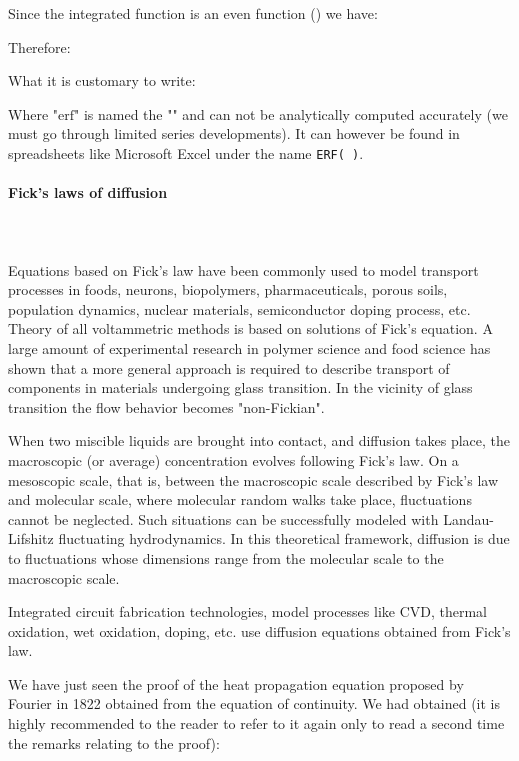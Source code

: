 	\begin{tcolorbox}[colframe=black,colback=white,sharp corners]
	
	Since the integrated function is an even function () we have:
	
	Therefore:
	
	What it is customary to write:
	
	Where "$\mathrm{erf}$" is named the "" and can not be analytically computed accurately (we must go through limited series developments). It can however be found in spreadsheets like Microsoft Excel under the name \texttt{ERF( )}.	
	\end{tcolorbox}
	
	\pagebreak
	\paragraph{Fick's laws of diffusion}\mbox{}\\\\
	Equations based on Fick's law have been commonly used to model transport processes in foods, neurons, biopolymers, pharmaceuticals, porous soils, population dynamics, nuclear materials, semiconductor doping process, etc. Theory of all voltammetric methods is based on solutions of Fick's equation. A large amount of experimental research in polymer science and food science has shown that a more general approach is required to describe transport of components in materials undergoing glass transition. In the vicinity of glass transition the flow behavior becomes "non-Fickian".

	When two miscible liquids are brought into contact, and diffusion takes place, the macroscopic (or average) concentration evolves following Fick's law. On a mesoscopic scale, that is, between the macroscopic scale described by Fick's law and molecular scale, where molecular random walks take place, fluctuations cannot be neglected. Such situations can be successfully modeled with Landau-Lifshitz fluctuating hydrodynamics. In this theoretical framework, diffusion is due to fluctuations whose dimensions range from the molecular scale to the macroscopic scale.

	Integrated circuit fabrication technologies, model processes like CVD, thermal oxidation, wet oxidation, doping, etc. use diffusion equations obtained from Fick's law.
	
	We have just seen the proof of the heat propagation equation proposed by Fourier in 1822 obtained from the equation of continuity. We had obtained (it is highly recommended to the reader to refer to it again only to read a second time the remarks relating to the proof):
	

